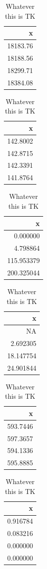 \documentclass[english,,jou,floatsintext]{apa6}
\begin{document}
\begin{table}
\caption{\label{tab:h2waics}Whatever this is TK}

\centering
\begin{tabular}[t]{r}
\hline
x\\
\hline
18183.76\\
\hline
18188.56\\
\hline
18299.71\\
\hline
18384.08\\
\hline
\end{tabular}
\centering
\begin{tabular}[t]{r}
\hline
x\\
\hline
142.8002\\
\hline
142.8715\\
\hline
142.3391\\
\hline
141.8764\\
\hline
\end{tabular}
\centering
\begin{tabular}[t]{r}
\hline
x\\
\hline
0.000000\\
\hline
4.798864\\
\hline
115.953379\\
\hline
200.325044\\
\hline
\end{tabular}
\centering
\begin{tabular}[t]{r}
\hline
x\\
\hline
NA\\
\hline
2.692305\\
\hline
18.147754\\
\hline
24.901844\\
\hline
\end{tabular}
\centering
\begin{tabular}[t]{r}
\hline
x\\
\hline
593.7446\\
\hline
597.3657\\
\hline
594.1336\\
\hline
595.8885\\
\hline
\end{tabular}
\centering
\begin{tabular}[t]{r}
\hline
x\\
\hline
0.916784\\
\hline
0.083216\\
\hline
0.000000\\
\hline
0.000000\\
\hline
\end{tabular}
\end{table}
\end{document}
